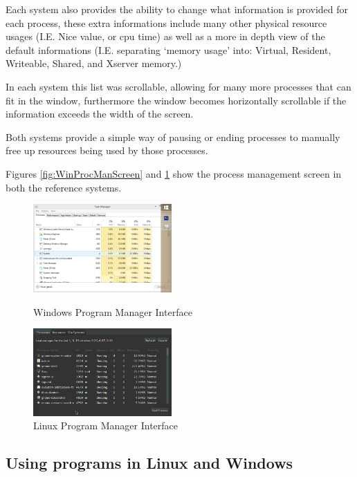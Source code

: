 \documentclass[a4paper]{report}
\begin{document}
Each system also provides the ability to change what information is provided for each process, these extra informations include many other physical resource usages (I.E. Nice value, or cpu time) as well as a more in depth view of the default informations (I.E. separating `memory usage' into: Virtual, Resident, Writeable, Shared, and Xserver memory.)

In each system this list was scrollable, allowing for many more processes that can fit in the window, furthermore the window becomes horizontally scrollable if the information exceeds the width of the screen.

Both systems provide a simple way of pausing or ending processes to manually free up resources being used by those processes.

Figures \ref{fig:WinProcManScreen} and \ref{fig:LinProcManScreen} show the process management screen in both the reference systems.

\begin{figure}[ht]
\centering
\begin{minipage}{.5\textwidth}
  \centering
  \includegraphics[width=200px]{images/Windows_Program_Manager_Screenshot}
  \caption{Windows Program Manager Interface}
  \label{fig:WinProcManScreen}
\end{minipage}%
\begin{minipage}{.5\textwidth}
  \centering
  \includegraphics[width=200px]{images/Linux_Program_Manager_Screenshot}
  \caption{Linux Program Manager Interface}
  \label{fig:LinProcManScreen}
\end{minipage}
\end{figure}


\subsection{Using programs in Linux and Windows}
\end{document}
